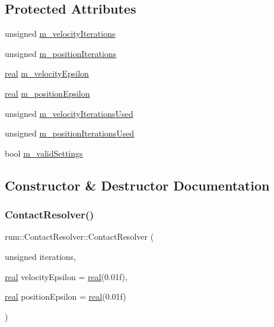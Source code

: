 \subsection*{Protected Attributes}
\begin{DoxyCompactItemize}
\item 
unsigned \hyperlink{classrum_1_1_contact_resolver_a69b94c3b3bffe713655ed4b2209d17c3}{m\+\_\+velocity\+Iterations}
\item 
unsigned \hyperlink{classrum_1_1_contact_resolver_adb8b6bf74fdb76f502f412b947a6b6b9}{m\+\_\+position\+Iterations}
\item 
\hyperlink{namespacerum_a7e8cca23573d5eaead0f138cbaa4862c}{real} \hyperlink{classrum_1_1_contact_resolver_a2bd8f6cd976d45ce1fb8407c58d68e96}{m\+\_\+velocity\+Epsilon}
\item 
\hyperlink{namespacerum_a7e8cca23573d5eaead0f138cbaa4862c}{real} \hyperlink{classrum_1_1_contact_resolver_a7de7422d90c874c9b3852fb98612c6ce}{m\+\_\+position\+Epsilon}
\item 
unsigned \hyperlink{classrum_1_1_contact_resolver_a1f26bcb510350f094a9488c09125bcd7}{m\+\_\+velocity\+Iterations\+Used}
\item 
unsigned \hyperlink{classrum_1_1_contact_resolver_ad71be20b842af92754adcf9310a54fd6}{m\+\_\+position\+Iterations\+Used}
\item 
bool \hyperlink{classrum_1_1_contact_resolver_ab96daf85e76174045aada60b973bea4f}{m\+\_\+valid\+Settings}
\end{DoxyCompactItemize}


\subsection{Constructor \& Destructor Documentation}
\mbox{\label{classrum_1_1_contact_resolver_adaf1fa2fd7b845fb3b0496505074bd01}} 
\subsubsection{\texorpdfstring{Contact\+Resolver()}{ContactResolver()}\hspace{0.1cm}{\footnotesize\ttfamily [1/2]}}
{\footnotesize\ttfamily rum\+::\+Contact\+Resolver\+::\+Contact\+Resolver (\begin{DoxyParamCaption}\item[{unsigned}]{iterations,  }\item[{\hyperlink{namespacerum_a7e8cca23573d5eaead0f138cbaa4862c}{real}}]{velocity\+Epsilon = {\ttfamily \hyperlink{namespacerum_a7e8cca23573d5eaead0f138cbaa4862c}{real}(0.01f)},  }\item[{\hyperlink{namespacerum_a7e8cca23573d5eaead0f138cbaa4862c}{real}}]{position\+Epsilon = {\ttfamily \hyperlink{namespacerum_a7e8cca23573d5eaead0f138cbaa4862c}{real}(0.01f)} }\end{DoxyParamCaption})}

